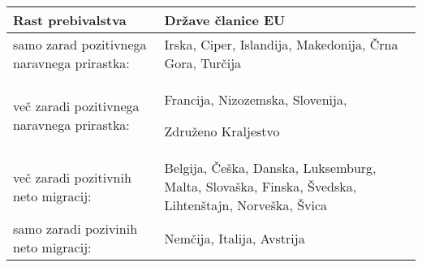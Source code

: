 \documentclass[11pt,a4paper]{article}
\begin{document}
\begin{table} [h!]

\begin{center}


\begin{tabular}{|l| l| }


\hline


\textbf{Rast prebivalstva}&\textbf{Države članice EU} \\


\hline


\multicolumn{1}{|l|}{samo zarad pozitivnega naravnega prirastka:}&\multicolumn{1}{|p{8cm}|}{ Irska, Ciper, Islandija, Makedonija, Črna Gora, Turčija} \\


\hline


\multicolumn{1}{|l|}{več zaradi pozitivnega naravnega prirastka:}&\multicolumn{1}{|p{8cm}|}{Francija, Nizozemska, Slovenija,

Združeno Kraljestvo}\\


\hline


\multicolumn{1}{|l|}{več zaradi pozitivnih neto migracij:}&\multicolumn{1}{|p{8cm}|}{Belgija, Češka, Danska, Luksemburg, Malta, Slovaška, Finska, Švedska, Lihtenštajn, Norveška, Švica}\\


\hline


\multicolumn{1}{|l|}{samo zaradi pozivinih neto migracij:}&\multicolumn{1}{|l|}{Nemčija, Italija, Avstrija}\\


\hline


\end{tabular}

\end{center}

\end{table}
\end{document}
